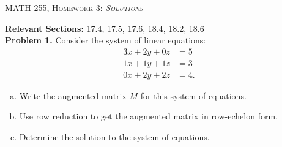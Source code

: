 \documentclass[12pt]{report} %
\theoremstyle{definition}
\begin{document}
\begin{center}
   \textsc{\large MATH 255, Homework 3: \emph{Solutions}}\\
\end{center}
\vspace{.5cm}

\noindent\textbf{Relevant Sections:} 17.4, 17.5, 17.6, 18.4, 18.2, 18.6 \\

\noindent\textbf{Problem 1.} Consider the system of linear equations:
\begin{align*}
    3x+2y+0z&=5\\
    1x+1y+1z&=3\\
    0x+2y+2z&=4.
\end{align*}
\begin{enumerate}[(a)]
    \item Write the augmented matrix $M$ for this system of equations.
    \item Use row reduction to get the augmented matrix in row-echelon form.
    \item Determine the solution to the system of equations.
\end{enumerate}
\end{document}
